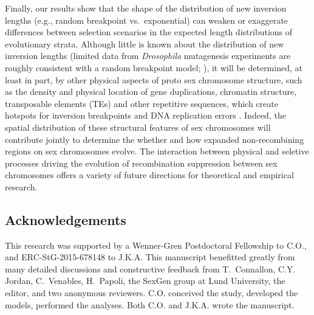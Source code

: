 \documentclass{article}
\begin{document}
Finally, our results show that the shape of the distribution of new inversion lengths (e.g., random breakpoint vs.~exponential) can weaken or exaggerate differences between selection scenarios in the expected length distributions of evolutionary strata. Although little is known about the distribution of new inversion lengths (limited data from {\itshape Drosophila} mutagenesis experiments are roughly consistent with a random breakpoint model; \citealt{KrimbasPowell1992}), it will be determined, at least in part, by other physical aspects of proto sex chromosome structure, such as the density and physical location of gene duplications, chromatin structure, transposable elements (TEs) and other repetitive sequences, which create hotspots for inversion breakpoints and DNA replication errors \citep[e.g.,][]{Charlesworth1994, PevznerTesler2003, PengPevznerTesler2006, LeeBatzer2008}. Indeed, the spatial distribution of these structural features of sex chromosomes will contribute jointly to determine the whether and how expanded non-recombining regions on sex chromosomes evolve. The interaction between physical and seletive processes driving the evolution of recombination suppression between sex chromosomes offers a variety of future directions for theoretical and empirical research.





\subsection*{Acknowledgements}
This research was supported by a Wenner-Gren Postdoctoral Fellowship to C.O., and ERC-StG-2015-678148 to J.K.A. This manuscript benefitted greatly from many detailed discussions and constructive feedback from T.~Connallon, C.Y. Jordan, C.~Venables, H.~Papoli, the SexGen group at Lund University, the editor, and two anonymous reviewers. C.O. conceived the study, developed the models, performed the analyses. Both C.O. and J.K.A. wrote the manuscript.






\end{document}

